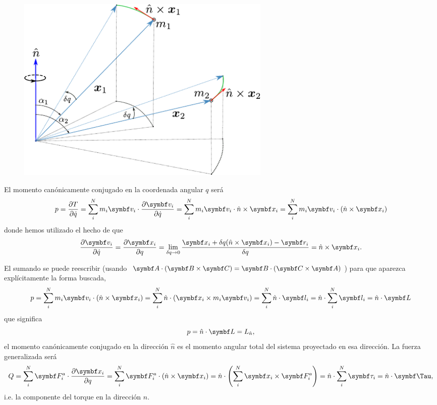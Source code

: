 \documentclass[10pt,oneside]{CBFT_book}
\begin{document}
\begin{figure}[htb]
	\begin{center}
	\includegraphics[width=0.6\textwidth]{images/fig_mc_rot_rig.pdf}	 
	\end{center}
	\caption{}
	\label{rotacion_rigida}
\end{figure} 
El momento canónicamente conjugado en la coordenada angular $q$ será
\[
	p = \dpar{T}{\dot{q}} = 
	\sum_i^N m_i \vb{v}_i \cdot \dpar{\vb{v}_i}{\dot{q}} =
	\sum_i^N m_i \vb{v}_i \cdot \hat{n} \times \vb{x}_i = 
	\sum_i^N m_i \vb{v}_i \cdot ( \hat{n} \times \vb{x}_i )
\]
donde hemos utilizado el hecho de que 
\[
	\dpar{\vb{v}_i}{\dot{q}} = \dpar{\vb{x}_i}{q} = 
	\lim_{\delta q \to 0} \frac{ \vb{x}_i +\delta q (\hat{n} \times \vb{x}_i)- 
	\vb{r}_i}{\delta q} = \hat{n} \times \vb{x}_i. 
\]

El sumando se puede reescribir (usando $\vb{A}\cdot(\vb{B}\times\vb{C}) = 
\vb{B}\cdot(\vb{C}\times\vb{A})$) para que aparezca explícitamente la forma buscada,
\[
	p = \sum_i^N m_i \vb{v}_i \cdot ( \hat{n} \times \vb{x}_i ) =
	\sum_i^N \hat{n} \cdot ( \vb{x}_i \times m_i \vb{v}_i  ) =
	\sum_i^N \hat{n} \cdot \vb{l}_i = \hat{n} \cdot \sum_i^N \vb{l}_i =
	\hat{n} \cdot \vb{L}
\]
que significa
\[
	p = \hat{n} \cdot \vb{L} = L_{\hat{n}},
\]
el momento canónicamente conjugado en la dirección $\hat{n}$ es el momento angular total
del sistema proyectado en esa dirección.
La fuerza generalizada será
\[
	Q = \sum_i^N \vb{F}^a_i \cdot \dpar{\vb{x}_i}{q} = 
	\sum_i^N \vb{F}^a_i \cdot ( \hat{n} \times \vb{x}_i ) = 
	\hat{n} \cdot \left( \sum_i^N \vb{x}_i \times  \vb{F}^a_i \right) = 
	\hat{n} \cdot \sum_i^N \vb{\tau}_i = \hat{n} \cdot \vb{\Tau},
\]
i.e. la componente del torque en la dirección $ \hat{n} $.
\end{document}
